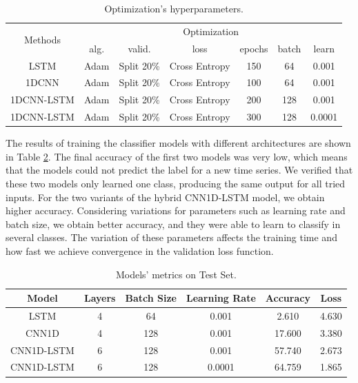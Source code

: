 \begin{table}[h]
	\centering
	\small
	\begin{tabular}{|c|c|c|c|c|c|c|}
		\hline
		\multirow{2}{*}{Methods} & \multicolumn{6}{c|}{Optimization} \\
		\cline{2-7}
		& alg. & valid. & loss & epochs & batch & learn \\
		\cline{2-7}
		\hline
		LSTM & Adam & Split 20\% & Cross Entropy & 150 & 64 & 0.001 \\
		\hline
		1DCNN & Adam & Split 20\% & Cross Entropy & 100 & 64 & 0.001 \\
		\hline
		1DCNN-LSTM & Adam & Split 20\% & Cross Entropy & 200 & 128 & 0.001 \\
		\hline
		1DCNN-LSTM & Adam & Split 20\% & Cross Entropy & 300 & 128 & 0.0001 \\
		\hline
	\end{tabular}
	\caption{Optimization’s hyperparameters.}
	\label{Table:OptimizationNN}
\end{table}

The results of training the classifier models with different architectures are shown in Table \ref{Table:DLModels}. The final accuracy of the first two models was very low, which means that the models could not predict the label for a new time series. We verified that these two models only learned one class, producing the same output for all tried inputs. For the two variants of the hybrid CNN1D-LSTM model, we obtain higher accuracy. Considering variations for parameters such as learning rate and batch size, we obtain better accuracy, and they were able to learn to classify in several classes. The variation of these parameters affects the training time and how fast we achieve convergence in the validation loss function. 

\begin{table}[h]
	\centering
	\small
	\begin{tabular}{|c|c|c|c|c|c|}
		\hline
		Model        & Layers & Batch Size & Learning Rate & Accuracy & Loss \\ \hline
		LSTM         & 4      &  64        & 0.001         &  2.610   & 4.630           \\
		CNN1D        & 4      & 128        & 0.001         & 17.600   & 3.380           \\
		CNN1D-LSTM  & 6      & 128        & 0.001         & 57.740   & 2.673           \\ 		
		CNN1D-LSTM  & 6      & 128        & 0.0001		   & 64.759   & 1.865           \\ \hline		
	\end{tabular}
\caption{Models' metrics on Test Set.}
\label{Table:DLModels}
\end{table}

